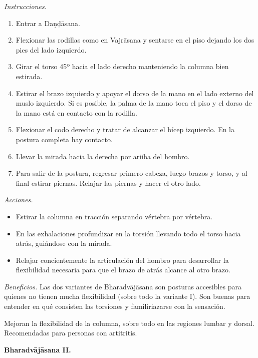 \emph{Instrucciones.}
\begin{enumerate}
\item Entrar a Daṇḍāsana.
\item Flexionar las rodillas como en
Vajrāsana y sentarse en el piso dejando los
dos pies del lado izquierdo.
\item Girar el torso 45º hacia el lado
derecho manteniendo la columna bien estirada.
\item Estirar el brazo izquierdo y apoyar el
dorso de la mano en el lado externo del muslo
izquierdo. Si es posible, la palma de la mano
toca el piso y el dorso de la mano está en
contacto con la rodilla.
\item Flexionar el codo derecho y tratar de
alcanzar el bícep izquierdo. En la postura
completa hay contacto.
\item Llevar la mirada hacia la derecha por
ariiba del hombro.
\item Para salir de la postura, regresar
primero cabeza, luego brazos y torso, y al
final estirar piernas. Relajar las piernas y
hacer el otro lado.
\end{enumerate}

\emph{Acciones.}
\begin{itemize}
\item Estirar la columna en tracción
separando vértebra por vértebra.
\item En las exhalaciones profundizar en la
torsión llevando todo el torso hacia atrás,
guiándose con la mirada.
\item Relajar concientemente la articulación
del hombro para desarrollar la flexibilidad
necesaria para que el brazo de atrás alcance
al otro brazo.
\end{itemize}

\emph{Beneficios.} Las dos variantes de
Bharadvājāsana son posturas accesibles para
quienes no tienen mucha flexibilidad (sobre
todo la variante I). Son buenas para entender
en qué consisten las torsiones y
familiriazarse con la sensación.

Mejoran la flexibilidad de la columna, sobre
todo en las regiones lumbar y dorsal.
Recomendadas para personas con artitritis.

\medskip\noindent\textbf{Bharadvājāsana II.}

